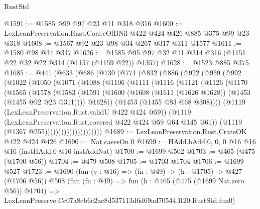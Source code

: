 \begin{lexlean}{RustStd}
\begin{coremodule}
@1591 := @1585 @99 @97 @23 @11 @318 @316
@1600 := LexLeanPreservation.Rust.Corr.eOfBNil @422 @424 @426 @885 @375 @99 @23 @318
@1608 := @1567 @92 @23 @98 @34 @267 @317 @311 @1577
@1611 := @1580 @98 @34 @317
@1626 := @1585 @95 @97 @32 @11 @314 @316 (@1151 @22 @32 @22 @314 (@1157 (@1159 @22)) @1357)
@1628 := @1523 @885 @375
@1685 := @441
    (@633
      (@686
        (@730
          (@771
            (@832
              (@886
                (@922
                  (@959
                    (@992
                      (@1022
                        (@1050
                          (@1071
                            (@1088
                              (@1106
                                (@1111
                                  (@1116
                                    (@1121
                                      (@1126
                                        (@1170
                                          (@1565
                                            (@1578
                                              (@1583
                                                (@1591
                                                  (@1600
                                                    (@1608
                                                      (@1611 (@1626 @1628))
                                                      (@1453 (@1455 @92 @23 @311))))
                                                  @1628))
                                              (@1453 (@1455 @83 @68 @308))))
                                          (@1119 (LexLeanPreservation.Rust.validU @422 @424 @59))
                                          (@1119
                                            (LexLeanPreservation.Rust.covered
                                              @422
                                              @424
                                              @59
                                              @64
                                              @145
                                              @61))
                                          (@1119 (@1367 @255)))))))))))))))))))))
@1689 := LexLeanPreservation.Rust.CrateOK @422 @424 @426
@1690 := Nat.casesOn.{0}
@1699 := HAdd.hAdd.{0, 0, 0} @16 @16 @16 (instHAdd.{0} @16 instAddNat)
@1700 := @1699 @502
@1703 := @465 (@475 (@1700 @56))
@1704 := @479 @508
@1705 := @1703 @1704
@1706 := @1699 @527
@1723 := @1690
    (fun (y : @16) => (fn : @49) -> (h : @1705) -> @427 (@1706 @56))
    @508
    (fun (fn : @49) =>
    fun (h : @465 (@475 (@1699 Nat.zero @56)) @1704) =>
    LexLeanPreserve.Cc07a8cb6c2ac8d537113d6d69ad70544.R20.RustStd.fun0)

\end{coremodule}
\end{lexlean}
